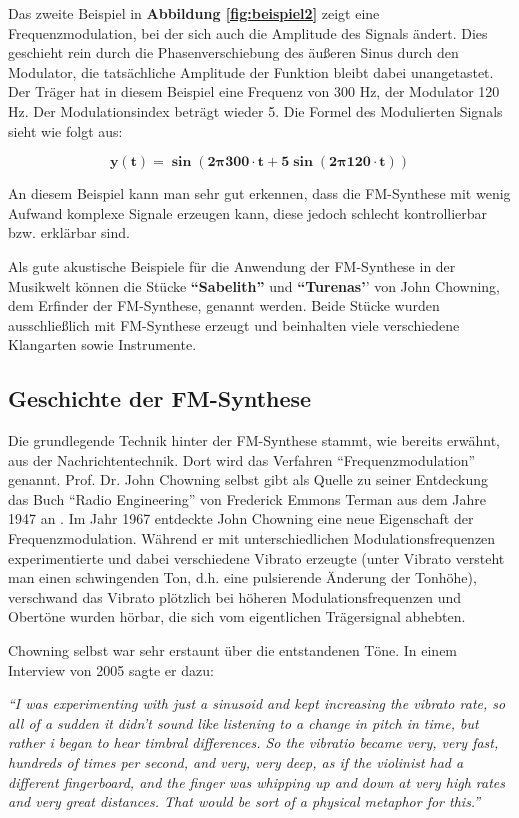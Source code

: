 Das zweite Beispiel in \textbf{Abbildung \ref{fig:beispiel2}} zeigt eine Frequenzmodulation, bei der sich auch die Amplitude des Signals ändert. Dies geschieht rein durch die Phasenverschiebung des äußeren Sinus durch den Modulator, die tatsächliche Amplitude der Funktion bleibt dabei unangetastet. Der Träger hat in diesem Beispiel eine Frequenz von 300 Hz, der Modulator 120 Hz. Der Modulationsindex beträgt wieder 5. Die Formel des Modulierten Signals sieht wie folgt aus:

\[
\bm{y(t) = \sin(2 \pmb{\pi} 300\cdot t + 5 \sin(2 \pmb{\pi} 120\cdot t))}
\]

An diesem Beispiel kann man sehr gut erkennen, dass die FM-Synthese mit wenig Aufwand komplexe Signale erzeugen kann, diese jedoch schlecht kontrollierbar bzw. erklärbar sind.

Als gute akustische Beispiele für die Anwendung der FM-Synthese in der Musikwelt können die Stücke \textbf{``Sabelith''} und \textbf{``Turenas'}' von John Chowning, dem Erfinder der FM-Synthese, genannt werden. Beide Stücke wurden ausschließlich mit FM-Synthese erzeugt und beinhalten viele verschiedene Klangarten sowie Instrumente.

\FloatBarrier
\subsection{Geschichte der FM-Synthese}
Die grundlegende Technik hinter der FM-Synthese stammt, wie bereits erwähnt, aus der Nachrichtentechnik. Dort wird das Verfahren ``Frequenzmodulation'' genannt. Prof. Dr. John Chowning selbst gibt als Quelle zu seiner Entdeckung das Buch ``Radio Engineering'' von Frederick Emmons Terman aus dem Jahre 1947 an \cite[S. 35]{soundofinnovation}. Im Jahr 1967 entdeckte John Chowning eine neue Eigenschaft der Frequenzmodulation. Während er mit unterschiedlichen Modulationsfrequenzen experimentierte und dabei verschiedene Vibrato erzeugte (unter Vibrato versteht man einen schwingenden Ton, d.h. eine pulsierende Änderung der Tonhöhe), verschwand das Vibrato plötzlich bei höheren Modulationsfrequenzen und Obertöne wurden hörbar, die sich vom eigentlichen Trägersignal abhebten.\cite{fatherofdigitalmusik}

Chowning selbst war sehr erstaunt über die entstandenen Töne. In einem Interview von 2005 sagte er dazu: 

\textit{``I was experimenting with just a sinusoid and kept increasing the vibrato rate, so all of a sudden it didn't sound like listening to a change in pitch in time, but rather i began to hear timbral differences. So the vibratio became very, very fast, hundreds of times per second, and very, very deep, as if the violinist had a different fingerboard, and the finger was whipping up and down at very high rates and very great distances. That would be sort of a physical metaphor for this.''}\cite[S. 34f.]{soundofinnovation}

